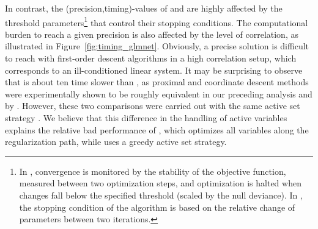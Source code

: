   In contrast, the (precision,timing)-values of  and
   are highly affected by the threshold
  parameters\footnote{%
    In , convergence is monitored by the stability of the
    objective function, measured between two optimization steps, and
    optimization is halted when changes fall below the specified threshold
    (scaled by the null deviance).
    In , the stopping condition of the algorithm is based
    on the relative change of parameters between two iterations.}
  that control their stopping conditions.
  The computational burden to reach a given precision is also affected by the
  level of correlation, as illustrated in Figure~\ref{fig:timing_glmnet}.
  Obviously, a precise solution is difficult to reach with first-order descent
  algorithms in a high correlation setup, which corresponds to an
  ill-conditioned linear system.
  It may be surprising to observe that  is about ten time
  slower than , as proximal and coordinate descent
  methods were experimentally shown to be roughly equivalent in our preceding
  analysis and by \citet{2012_FML_Bach}.
  However, these two comparisons were carried out with the same active set 
  strategy \citep[that is, \emph{with} active set for ours and \emph{without} 
  active set for][]{2012_FML_Bach}.
  We believe that this difference in the handling of active variables explains
  the relative bad performance of , which optimizes all
  variables along the regularization path, while   uses a 
  greedy active set strategy. 

